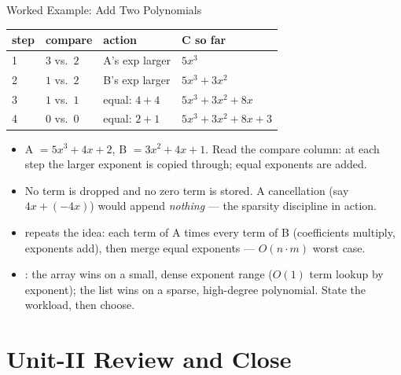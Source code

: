 \documentclass[aspectratio=169]{beamer}
\begin{document}
\begin{frame}{Worked Example: Add Two Polynomials}
  \begin{center}
  {\small
  \begin{tabular}{llll}
    \toprule
    \textbf{step} & \textbf{compare} & \textbf{action} & \textbf{C so far} \\
    \midrule
    1 & $3$ vs.\ $2$ & A's exp larger & $5x^{3}$ \\
    2 & $1$ vs.\ $2$ & B's exp larger & $5x^{3} + 3x^{2}$ \\
    3 & $1$ vs.\ $1$ & equal: $4 + 4$ & $5x^{3} + 3x^{2} + 8x$ \\
    4 & $0$ vs.\ $0$ & equal: $2 + 1$ & $5x^{3} + 3x^{2} + 8x + 3$ \\
    \bottomrule
  \end{tabular}}
  \end{center}
  \begin{itemize}
    \item A $= 5x^{3} + 4x + 2$, B $= 3x^{2} + 4x + 1$. Read the compare
      column: at each step the larger exponent is copied through; equal
      exponents are added.
    \item No term is dropped and no zero term is stored. A cancellation (say
      $4x + (-4x)$) would append \emph{nothing} --- the sparsity discipline
      in action.
    \item {} repeats the idea: each term of A times every
      term of B (coefficients multiply, exponents add), then merge equal
      exponents --- $O(n \cdot m)$ worst case.
    \item {}: the array wins on a small, dense exponent range
      ($O(1)$ term lookup by exponent); the list wins on a sparse, high-degree
      polynomial. State the workload, then choose.
  \end{itemize}
\end{frame}


\section{Unit-II Review and Close}
\end{document}
